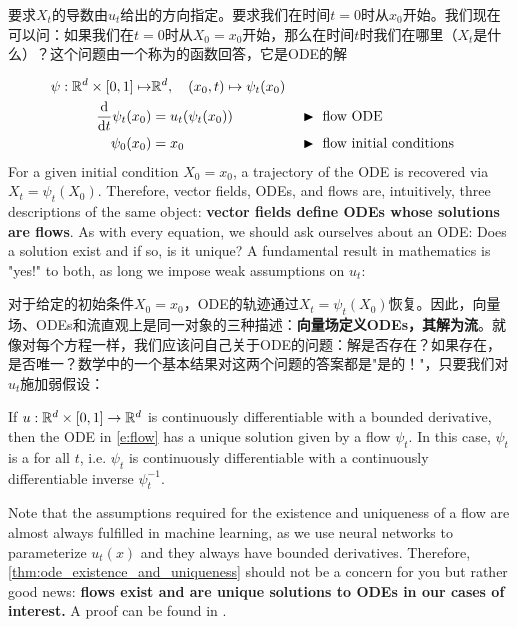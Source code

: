要求$X_t$的导数由$u_t$给出的方向指定。要求我们在时间$t=0$时从$x_0$开始。我们现在可以问：如果我们在$t=0$时从$X_0 = x_0$开始，那么在时间$t$时我们在哪里（$X_t$是什么）？这个问题由一个称为的函数回答，它是ODE的解

\begin{subequations}\label{e:flow}
    \begin{align}
    \psi:\mathbb{R}^d\times [0,1]\mapsto& \mathbb{R}^d,\quad (x_0,t)\mapsto \psi_t(x_0)\\
      \frac{\mathrm{d}}{\mathrm{d} t}\psi_{t}(x_0) &= u_t(\psi_{t}(x_0)) &&\blacktriangleright\,\, \text{flow ODE}\label{e:flow_flow}\\
      \psi_{0}(x_0)             &= x_0                &&\blacktriangleright\,\,\text{flow initial conditions}\label{e:flow_boundary} 
    \end{align}
\end{subequations}
For a given initial condition $X_0=x_0$, a trajectory of the ODE is recovered via $X_t = \psi_t(X_0)$. Therefore, vector fields, ODEs, and flows are, intuitively, three descriptions of the same object: \textbf{vector fields define ODEs whose solutions are flows}. As with every equation, we should ask ourselves about an ODE: Does a solution exist and if so, is it unique? A fundamental result in mathematics is "yes!" to both, as long we impose weak assumptions on $u_t$:

对于给定的初始条件$X_0=x_0$，ODE的轨迹通过$X_t = \psi_t(X_0)$恢复。因此，向量场、ODEs和流直观上是同一对象的三种描述：\textbf{向量场定义ODEs，其解为流}。就像对每个方程一样，我们应该问自己关于ODE的问题：解是否存在？如果存在，是否唯一？数学中的一个基本结果对这两个问题的答案都是"是的！"，只要我们对$u_t$施加弱假设：

\begin{theorem}
\label{thm:ode_existence_and_uniqueness}
If $u:\mathbb{R}^d\times[0,1]\to\mathbb{R}^d$ is continuously differentiable with a bounded derivative, then the ODE in \eqref{e:flow} has a unique solution given by a flow $\psi_t$. In this case, $\psi_t$ is a  for all $t$, i.e. $\psi_t$ is continuously differentiable with a continuously differentiable inverse $\psi_t^{-1}$.
\end{theorem}
Note that the assumptions required for the existence and uniqueness of a flow are almost always fulfilled in machine learning, as we use neural networks to parameterize $u_t(x)$ and they always have bounded derivatives. Therefore, \cref{thm:ode_existence_and_uniqueness} should not be a concern for you but rather good news: \textbf{flows exist and are unique solutions to ODEs in our cases of interest.} A proof can be found in \citep{perko2013differential,coddington1956theory}.

